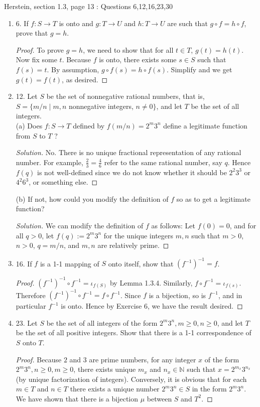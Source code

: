 
Herstein, section 1.3, page 13 : Questions 6,12,16,23,30
\begin{enumerate}
	\item 6. If $f: S \rightarrow T$ is onto and $g: T \rightarrow U$ and $h: T \rightarrow U$ are such that $g \circ f=h \circ f$, prove that $g=h$.
\begin{proof}
	To prove $g=h$, we need to show that for all $t \in T $, $g(t) = h(t)$. Now fix some $t $. Because $f $ is onto, there exists some $s \in  S $ such that $f(s) = t $. By assumption, $g \circ f (s) = h\circ f(s)$. Simplify and we get $g(t) = f(t)$, as desired.
\end{proof}
	\item 12. Let $S$ be the set of nonnegative rational numbers, that is, $S=\{m / n \mid m, n$ nonnegative integers, $n \neq 0\}$, and let $T$ be the set of all integers.\\
(a) Does $f: S \rightarrow T$ defined by $f(m / n)=2^{m} 3^{n}$ define a legitimate function from $S$ to $T$ ?
\begin{proof}[Solution]
	No. There is no unique fractional representation of any rational number. For example, $\frac{2}{3} = \frac{4}{6}$ refer to the same rational number, say $q$. Hence $f(q)$ is not well-defined since we do not know whether it should be $2^2 3^3$ or $4^2 6^3$, or something else.
\end{proof}
(b) If not, how could you modify the definition of $f$ so as to get a legitimate function?
\begin{proof}[Solution]
	We can modify the definition of $f $ as follows: Let $f(0) = 0$, and for all $q>0$, let $f(q) := 2^m 3^n$ for the unique integers $m, n$ such that $m> 0$, $n>0$, $q = m / n$, and $m, n$ are relatively prime.
\end{proof}
	\item 16. If $f$ is a 1-1 mapping of $S$ onto itself, show that $\left(f^{-1}\right)^{-1}=f$.
\begin{proof}
	$\left(f^{-1}\right)^{-1} \circ f^{-1}=\iota_{f(S)}$ by Lemma 1.3.4. Similarly, $f \circ f^{-1} = \iota_{f(s)}$. Therefore $\left(f^{-1}\right)^{-1} \circ f^{-1} = f \circ f^{-1}$. Since $f$ is a bijection, so is $f^{-1}$, and in particular $f^{-1}$ is onto. Hence by Exercise 6, we have the result desired.
	
\end{proof}
	\item 23. Let $S$ be the set of all integers of the form $2^{m} 3^{n}, m \geq 0, n \geq 0$, and let $T$ be the set of all positive integers. Show that there is a 1-1 correspondence of $S$ onto $T$.
\begin{proof}
	Because $2$ and  $3$ are prime numbers, for any integer $x$ of the form  $2^m 3^n, n\ge 0, m\ge 0$, there exists unique $m_x$ and $n_x \in \mathbb{N}$ such that $x = 2^{m_x}3^{n_x}$ (by unique factorization of integers). Conversely, it is obvious that for each $m \in T$ and $n \in T$ there exists a unique number $2^m 3^n \in S$ in the form $2^m 3^n$. We have shown that there is a bijection $\mu$ between $S$ and $T^2$.


\end{proof}
\end{enumerate}
